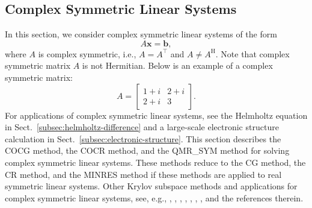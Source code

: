 \subsection{{Complex Symmetric Linear Systems}}\label{sec:complex-symmetric-linear-systems}
{In this section, we consider complex symmetric linear systems of the form}
\[A\bm x=\bm b,\]
{where $A$ is complex symmetric, i.e., $A=A^{\top}$ and $A\ne A^{\mathrm H}$. Note that complex symmetric matrix $A$ is not Hermitian. Below is an example of a complex symmetric matrix:}
\[A=\begin{bmatrix}1+i&2+i\\2+i&3\end{bmatrix}.\]
{For applications of complex symmetric linear systems, see the Helmholtz equation in Sect.\ \ref{subsec:helmholtz-difference} and a large-scale electronic structure calculation in Sect.\ \ref{subsec:electronic-structure}. This section describes the COCG method, the COCR method, and the QMR\_SYM method for solving complex symmetric linear systems. These methods reduce to the CG method, the CR method, and the MINRES method if these methods are applied to real symmetric linear systems. Other Krylov subspace methods and applications for complex symmetric linear systems, see, e.g., , , , , , , ,  and the references therein.}
